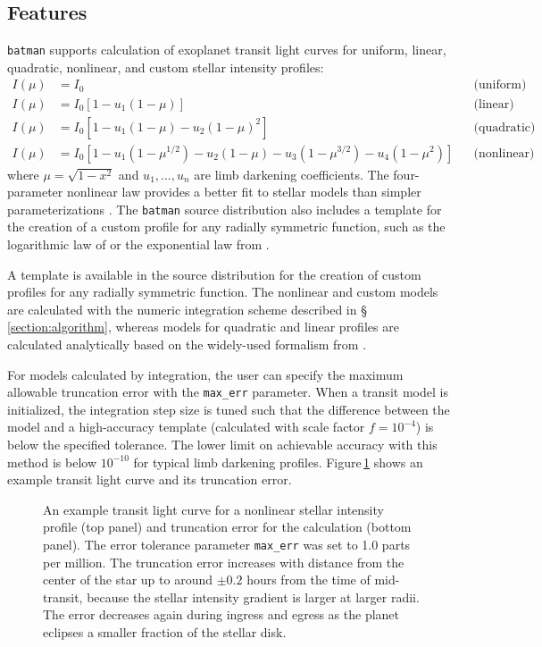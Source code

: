 \documentclass[12pt,preprint]{aastex}
\begin{document}
\subsection{Features}
\texttt{batman} supports calculation of exoplanet transit light curves for uniform, linear, quadratic, nonlinear, and custom stellar intensity profiles:
\begin{align}
  I(\mu) &= I_0                                                                         & &\text{(uniform)}             \\
  I(\mu) &= I_0[1 - u_1(1-\mu)]                                                         & &\text{(linear)}              \\
  I(\mu) &= I_0[1 - u_1(1 - \mu) - u_2(1-\mu)^2]                                        & &\text{(quadratic)}           \\
  I(\mu) &= I_0[1 - u_1(1-\mu^{1/2}) - u_2(1- \mu) - u_3(1-\mu^{3/2}) - u_4(1-\mu^2)]   & &\text{(nonlinear)}
\end{align}
where $\mu = \sqrt{1-x^2}$ and $u_1, ..., u_n$ are limb darkening coefficients.  The four-parameter nonlinear law provides a better fit to stellar models than simpler parameterizations \citep{claret00}.  The \texttt{batman} source distribution also includes a template for the creation of a custom profile for any radially symmetric function, such as the logarithmic law of \cite{klinglesmith70} or the exponential law from \cite{claret03}.

A template is available in the source distribution for the creation of custom profiles for any radially symmetric function.  The nonlinear and custom models are calculated with the numeric integration scheme described in \S\,\ref{section:algorithm}, whereas models for quadratic and linear profiles are calculated analytically based on the widely-used formalism from \cite{mandel02}.  

For models calculated by integration, the user can specify the maximum allowable truncation error with the \texttt{max\_err} parameter.  When a transit model is initialized, the integration step size is tuned such that the difference between the model and a high-accuracy template (calculated with scale factor $f = 10^{-4}$) is below the specified tolerance.  The lower limit on achievable accuracy with this method is below $10^{-10}$ for typical limb darkening profiles. Figure\,\ref{fig:transit} shows an example transit light curve and its truncation error.

\begin{figure}
\caption{An example transit light curve for a nonlinear stellar intensity profile (top panel) and truncation error for the calculation (bottom panel).  The error tolerance parameter \texttt{max\_err} was set to 1.0 parts per million.  The truncation error increases with distance from the center of the star up to around $\pm0.2$ hours from the time of mid-transit, because the stellar intensity gradient is larger at larger radii. The error decreases again during ingress and egress as the planet eclipses a smaller fraction of the stellar disk.}
\label{fig:transit}
\end{figure}
\end{document}
